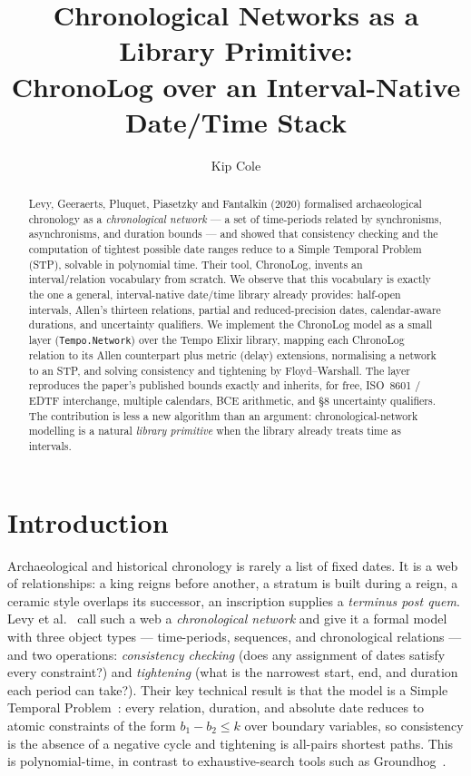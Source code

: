 \documentclass[a4paper,USenglish,cleveref,autoref,thm-restate]{oasics-v2021}
\title{Chronological Networks as a Library Primitive: \texorpdfstring{\\}{ }%
  ChronoLog over an Interval-Native Date/Time Stack}
\author{Kip Cole}{Independent}{kipcole9@gmail.com}{}{}
\begin{document}
\maketitle

\begin{abstract}
  Levy, Geeraerts, Pluquet, Piasetzky and Fantalkin (2020) formalised
  archaeological chronology as a \emph{chronological network} --- a set
  of time-periods related by synchronisms, asynchronisms, and duration
  bounds --- and showed that consistency checking and the computation
  of tightest possible date ranges reduce to a Simple Temporal Problem
  (STP), solvable in polynomial time. Their tool, ChronoLog, invents an
  interval/relation vocabulary from scratch. We observe that this
  vocabulary is exactly the one a general, interval-native date/time
  library already provides: half-open intervals, Allen's thirteen
  relations, partial and reduced-precision dates, calendar-aware
  durations, and uncertainty qualifiers. We implement the ChronoLog
  model as a small layer (\texttt{Tempo.Network}) over the Tempo Elixir
  library, mapping each ChronoLog relation to its Allen counterpart plus
  metric (delay) extensions, normalising a network to an STP, and
  solving consistency and tightening by Floyd--Warshall. The layer
  reproduces the paper's published bounds exactly and inherits, for
  free, ISO~8601 / EDTF interchange, multiple calendars, BCE arithmetic,
  and §8 uncertainty qualifiers. The contribution is less a new
  algorithm than an argument: chronological-network modelling is a
  natural \emph{library primitive} when the library already treats time
  as intervals.
\end{abstract}

\section{Introduction}

Archaeological and historical chronology is rarely a list of fixed
dates. It is a web of relationships: a king reigns before another, a
stratum is built during a reign, a ceramic style overlaps its
successor, an inscription supplies a \emph{terminus post quem}. Levy et
al.~\cite{levy2020} call such a web a \emph{chronological network} and
give it a formal model with three object types --- time-periods,
sequences, and chronological relations --- and two operations:
\emph{consistency checking} (does any assignment of dates satisfy every
constraint?) and \emph{tightening} (what is the narrowest start, end,
and duration each period can take?). Their key technical result is that
the model is a Simple Temporal Problem~\cite{dechter1991}: every
relation, duration, and absolute date reduces to atomic constraints of
the form $b_1 - b_2 \leq k$ over boundary variables, so consistency is
the absence of a negative cycle and tightening is all-pairs shortest
paths. This is polynomial-time, in contrast to exhaustive-search tools
such as Groundhog~\cite{falk2020}.
\end{document}
